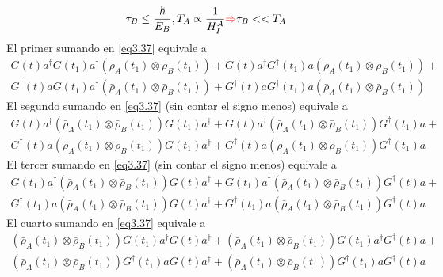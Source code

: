 \documentclass{book}
\begin{document}
 \begin{equation}\label{eq3.39} {\tau_B \leq \frac{\hslash}{E_B}, T_A\propto \frac{1}{H^A_I}\textcolor{red}{\Rightarrow} \tau_B << T_A}\end{equation}
 El primer sumando en \textcolor{blue}{\ref{eq3.37}} equivale a
 \begin{equation}\begin{aligned}\label{eq3.40} {G(t)a^\dag G(t_1)a^\dag(\bar{\rho}_A(t_1)\otimes\bar{\rho}_B(t_1))+ G(t)a^\dag G^\dag(t_1)a(\bar{\rho}_A(t_1)\otimes\bar{\rho}_B(t_1))+} \\ {G^\dag(t)a G(t_1)a^\dag(\bar{\rho}_A(t_1)\otimes\bar{\rho}_B(t_1))+ G^\dag(t)a G^\dag(t_1) a(\bar{\rho}_A(t_1)\otimes\bar{\rho}_B(t_1))}\end{aligned}\end{equation}
 El segundo sumando en \textcolor{blue}{\ref{eq3.37}} (sin contar el signo menos) equivale a
 \begin{equation}\label{eq3.41}\begin{aligned} {G(t)a^\dag(\bar{\rho}_A(t_1)\otimes\bar{\rho}_B(t_1))G(t_1)a^\dag+ G(t)a^\dag(\bar{\rho}_A(t_1)\otimes\bar{\rho}_B(t_1))G^\dag(t_1)a+} \\ {G^\dag(t)a(\bar{\rho}_A(t_1)\otimes\bar{\rho}_B(t_1))G(t_1)a^\dag+ G^\dag(t)a(\bar{\rho}_A(t_1)\otimes\bar{\rho}_B(t_1))G^\dag(t_1)a }\end{aligned}\end{equation}
 El tercer sumando en \textcolor{blue}{\ref{eq3.37}} (sin contar el signo menos) equivale a
 \begin{equation}\label{eq3.42}\begin{aligned} { G(t_1)a^\dag(\bar{\rho}_A(t_1)\otimes\bar{\rho}_B(t_1))G(t)a^\dag+ G(t_1)a^\dag(\bar{\rho}_A(t_1)\otimes\bar{\rho}_B(t_1))G^\dag(t)a+} \\ {G^\dag(t_1)a(\bar{\rho}_A(t_1)\otimes\bar{\rho}_B(t_1))G(t)a^\dag+ G^\dag(t_1)a(\bar{\rho}_A(t_1)\otimes\bar{\rho}_B(t_1))G^\dag(t)a}\end{aligned}\end{equation}
 El cuarto sumando en  \textcolor{blue}{\ref{eq3.37}} equivale a
 \begin{equation}\label{eq3.43}\begin{aligned} {(\bar{\rho}_A(t_1)\otimes\bar{\rho}_B(t_1))G(t_1)a^\dag G(t)a^\dag+(\bar{\rho}_A(t_1)\otimes\bar{\rho}_B(t_1))G(t_1)a^\dag G^\dag(t)a+}\\  { (\bar{\rho}_A(t_1)\otimes\bar{\rho}_B(t_1))G^\dag(t_1)a G(t)a^\dag +(\bar{\rho}_A(t_1)\otimes\bar{\rho}_B(t_1))G^\dag(t_1)a G^\dag(t)a }\end{aligned}\end{equation}
\end{document}
